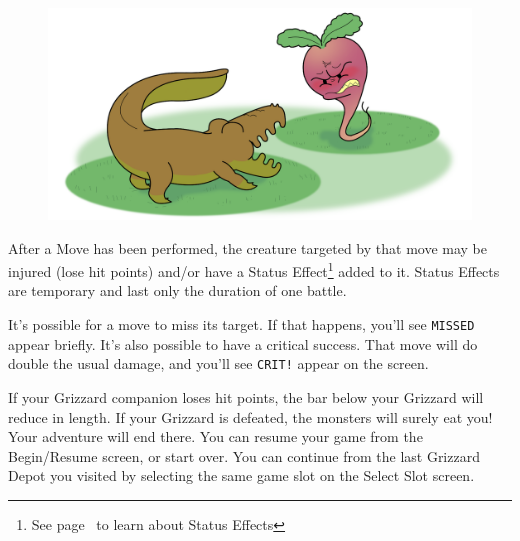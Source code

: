 \documentclass[10pt,twocolumn,openany,article]{memoir}
\begin{document}
\begin{figure}[b]
  \begin{center}
    \includegraphics[width=2\columnwidth,height=\columnwidth]{../Manual/GrizzardCombat.png}
  \end{center}
\end{figure}

After a Move has been performed,  the creature targeted by that move may
be injured  (lose hit points)  and/or have a  Status Effect\footnote{See
  page~\pageref{sec:StatusEffects} to learn  about Status Effects} added
to  it. Status  Effects  are temporary  and last  only  the duration  of
one battle.

It's possible for a move to miss its target. If that happens, you'll see
\texttt{MISSED} appear  briefly. It's also  possible to have  a critical
success.  That move  will do  double the  usual damage,  and you'll  see
\texttt{CRIT!} appear on the screen.

If your Grizzard companion loses hit points, the bar below your Grizzard
will reduce in  length. If your Grizzard is defeated,  the monsters will
surely eat you! Your adventure will end there. \ifdefined\NOSAVE You can
resume your game from the Begin/Resume  screen, or start over. \else You
can continue from  the last Grizzard Depot you visited  by selecting the
same game slot on the Select Slot screen. \fi
\end{document}
